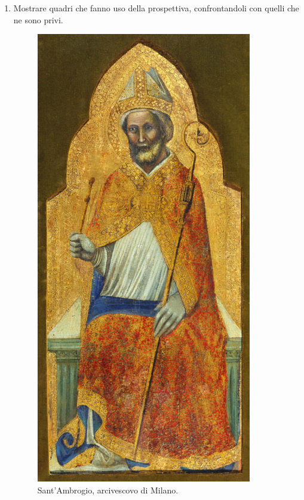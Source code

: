 \documentclass[12pt,a4paper]{article}
\begin{document}
\begin{enumerate}
	\item Mostrare quadri che fanno uso della prospettiva, confrontandoli con quelli che ne sono privi.  
	\begin{figure}[h!]
		\centering
		\includegraphics[scale=0.5]{SanAmbrogio.jpg}
		\caption{Sant'Ambrogio, arcivescovo di Milano.}
	\end{figure}
	

\end{enumerate}
\end{document}

